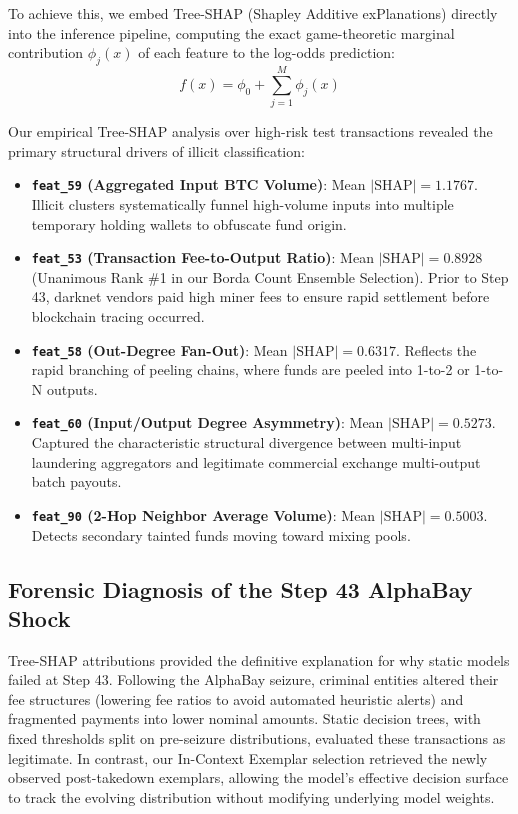 \documentclass[conference]{IEEEtran}
\begin{document}
To achieve this, we embed Tree-SHAP (Shapley Additive exPlanations) directly into the inference pipeline, computing the exact game-theoretic marginal contribution $\phi_j(x)$ of each feature to the log-odds prediction:
\begin{equation}
f(x) = \phi_0 + \sum_{j=1}^{M} \phi_j(x)
\end{equation}

Our empirical Tree-SHAP analysis over high-risk test transactions revealed the primary structural drivers of illicit classification:
\begin{itemize}
    \item \textbf{\texttt{feat\_59} (Aggregated Input BTC Volume)}: Mean $|\text{SHAP}| = 1.1767$. Illicit clusters systematically funnel high-volume inputs into multiple temporary holding wallets to obfuscate fund origin.
    \item \textbf{\texttt{feat\_53} (Transaction Fee-to-Output Ratio)}: Mean $|\text{SHAP}| = 0.8928$ (Unanimous Rank \#1 in our Borda Count Ensemble Selection). Prior to Step 43, darknet vendors paid high miner fees to ensure rapid settlement before blockchain tracing occurred.
    \item \textbf{\texttt{feat\_58} (Out-Degree Fan-Out)}: Mean $|\text{SHAP}| = 0.6317$. Reflects the rapid branching of peeling chains, where funds are peeled into 1-to-2 or 1-to-N outputs.
    \item \textbf{\texttt{feat\_60} (Input/Output Degree Asymmetry)}: Mean $|\text{SHAP}| = 0.5273$. Captured the characteristic structural divergence between multi-input laundering aggregators and legitimate commercial exchange multi-output batch payouts.
    \item \textbf{\texttt{feat\_90} (2-Hop Neighbor Average Volume)}: Mean $|\text{SHAP}| = 0.5003$. Detects secondary tainted funds moving toward mixing pools.
\end{itemize}

\subsection{Forensic Diagnosis of the Step 43 AlphaBay Shock}
Tree-SHAP attributions provided the definitive explanation for why static models failed at Step 43. Following the AlphaBay seizure, criminal entities altered their fee structures (lowering fee ratios to avoid automated heuristic alerts) and fragmented payments into lower nominal amounts. Static decision trees, with fixed thresholds split on pre-seizure distributions, evaluated these transactions as legitimate. In contrast, our In-Context Exemplar selection retrieved the newly observed post-takedown exemplars, allowing the model's effective decision surface to track the evolving distribution without modifying underlying model weights.
\end{document}
